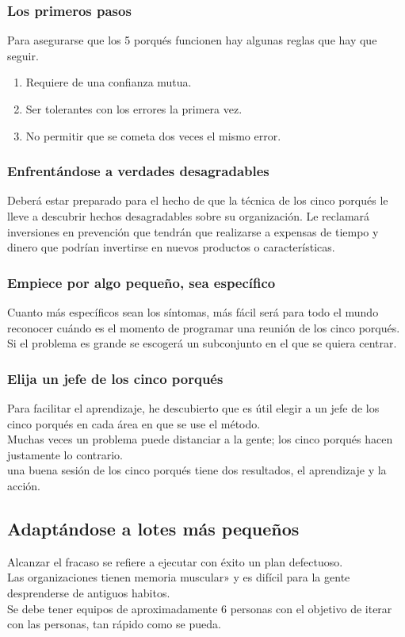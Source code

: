 \documentclass[10pt]{article}
\begin{document}
\begin{multicols}{2}
\subsubsection*{Los primeros pasos}
Para asegurarse que los 5 porqués funcionen hay algunas reglas que hay que seguir.
\begin{enumerate}[\bfseries 1.]
\item Requiere de una confianza mutua.\\
\item  Ser tolerantes con los errores la primera vez.
\item No permitir que se cometa dos veces el mismo error.
\end{enumerate}
\subsubsection*{Enfrentándose a verdades desagradables}
Deberá estar preparado para el hecho de que la técnica de los cinco porqués le lleve a descubrir hechos desagradables sobre su organización. Le reclamará inversiones en prevención que tendrán que realizarse a expensas de tiempo y dinero que podrían invertirse en nuevos productos o características.
\subsubsection*{Empiece por algo pequeño, sea específico}
Cuanto más específicos sean los síntomas, más fácil será para todo el mundo reconocer cuándo es el momento de programar una reunión de los cinco porqués. Si el problema es grande se escogerá un subconjunto en el que se quiera centrar.
\subsubsection*{Elija un jefe de los cinco porqués}
Para facilitar el aprendizaje, he descubierto que es útil elegir a un jefe de los cinco porqués en cada área en que se use el método. \\
 Muchas veces un problema puede distanciar a la gente; los cinco porqués hacen justamente lo contrario.
\\
una buena sesión de los cinco porqués tiene dos resultados, el aprendizaje y la acción.  
\subsection*{Adaptándose a lotes más pequeños}
Alcanzar el fracaso se refiere a ejecutar con éxito un plan defectuoso.\\
Las organizaciones tienen memoria muscular» y es difícil para la gente desprenderse de antiguos habitos.\\
Se debe tener equipos de aproximadamente 6 personas con el objetivo de iterar con las personas, tan rápido como se pueda.

\end{multicols}
\end{document}
